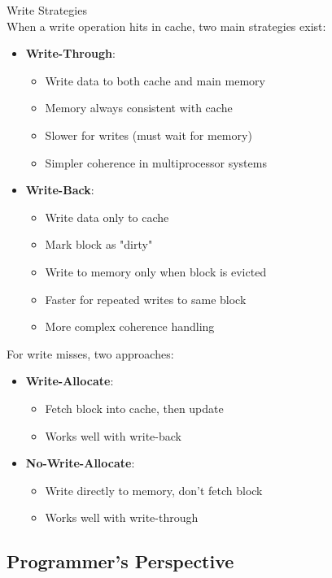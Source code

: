 \begin{definition}{Write Strategies}\\
When a write operation hits in cache, two main strategies exist:
\begin{itemize}
    \item \textbf{Write-Through}:
    \begin{itemize}
        \item Write data to both cache and main memory
        \item Memory always consistent with cache
        \item Slower for writes (must wait for memory)
        \item Simpler coherence in multiprocessor systems
    \end{itemize}
    \item \textbf{Write-Back}:
    \begin{itemize}
        \item Write data only to cache
        \item Mark block as "dirty"
        \item Write to memory only when block is evicted
        \item Faster for repeated writes to same block
        \item More complex coherence handling
    \end{itemize}
\end{itemize}

For write misses, two approaches:
\begin{itemize}
    \item \textbf{Write-Allocate}:
    \begin{itemize}
        \item Fetch block into cache, then update
        \item Works well with write-back
    \end{itemize}
    \item \textbf{No-Write-Allocate}:
    \begin{itemize}
        \item Write directly to memory, don't fetch block
        \item Works well with write-through
    \end{itemize}
\end{itemize}
\end{definition}

\multend

\subsection{Programmer's Perspective}

